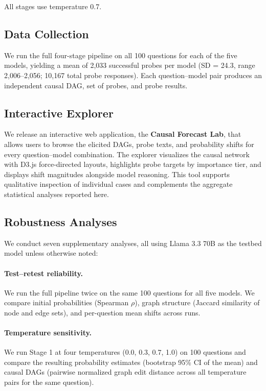 \documentclass[11pt]{article}
\begin{document}
All stages use temperature 0.7.

\subsection{Data Collection}

We run the full four-stage pipeline on all 100 questions for each of the five models, yielding a mean of 2,033 successful probes per model (SD = 24.3, range 2,006--2,056; 10,167 total probe responses). Each question--model pair produces an independent causal DAG, set of probes, and probe results.

\subsection{Interactive Explorer}

We release an interactive web application, the \textbf{Causal Forecast Lab}, that allows users to browse the elicited DAGs, probe texts, and probability shifts for every question--model combination. The explorer visualizes the causal network with D3.js force-directed layouts, highlights probe targets by importance tier, and displays shift magnitudes alongside model reasoning. This tool supports qualitative inspection of individual cases and complements the aggregate statistical analyses reported here.

\subsection{Robustness Analyses}

We conduct seven supplementary analyses, all using Llama 3.3 70B as the testbed model unless otherwise noted:

\paragraph{Test--retest reliability.} We run the full pipeline twice on the same 100 questions for all five models. We compare initial probabilities (Spearman $\rho$), graph structure (Jaccard similarity of node and edge sets), and per-question mean shifts across runs.

\paragraph{Temperature sensitivity.} We run Stage 1 at four temperatures (0.0, 0.3, 0.7, 1.0) on 100 questions and compare the resulting probability estimates (bootstrap 95\% CI of the mean) and causal DAGs (pairwise normalized graph edit distance across all temperature pairs for the same question).
\end{document}
